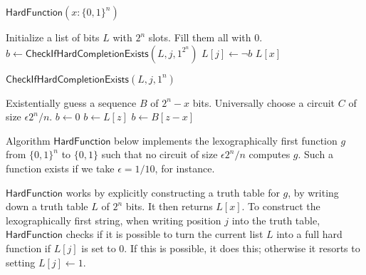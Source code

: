 \documentclass{article}
\begin{document}
\begin{algorithm}{$\mathsf{HardFunction}(x : \{0, 1\}^n)$}
\begin{algorithmic}[1]
	\STATE {}
	\STATE Initialize a list of bits $L$ with $2^n$ slots.  Fill them all with 0.
	\STATE {}
	\STATE {}
	\STATE $b \gets \mathsf{CheckIfHardCompletionExists}(L, j, 1^{2^n})$
	\STATE $L[j] \gets \neg b$
	\ENDFOR
	\RETURN $L[x]$
\end{algorithmic}
\end{algorithm}

\begin{algorithm}{$\mathsf{CheckIfHardCompletionExists}(L, j, 1^n)$}
	\begin{algorithmic}[1]
		\STATE {}
		\STATE Existentially guess a sequence $B$ of $2^n - x$ bits.
		\STATE Universally choose a circuit $C$ of size $\epsilon 2^n/n$.
			\STATE {}
				\STATE $b \gets 0$
				\STATE $b \gets L[z]$
			\ELSE
				\STATE $b \gets B[z - x]$
			\ENDIF

			\STATE {}
			\ENDIF
		\ENDFOR
	\end{algorithmic}
\end{algorithm}


Algorithm $\mathsf{HardFunction}$ below implements the lexographically first function $g$ from $\{0, 1\}^n$ to $\{0, 1\}$ such that no circuit of size $\epsilon 2^n/n$ computes $g$.
Such a function exists if we take $\epsilon = 1/10$, for instance.

$\mathsf{HardFunction}$ works by explicitly constructing a truth table for $g$, by writing down a truth table $L$ of $2^n$ bits.  It then returns $L[x]$.
To construct the lexographically first string, when writing position $j$ into the truth table, $\mathsf{HardFunction}$ checks if it is possible to turn the current list $L$ into a full hard function if $L[j]$ is set to 0.  If this is possible, it does this; otherwise it resorts to setting $L[j] \gets 1$.
\end{document}
